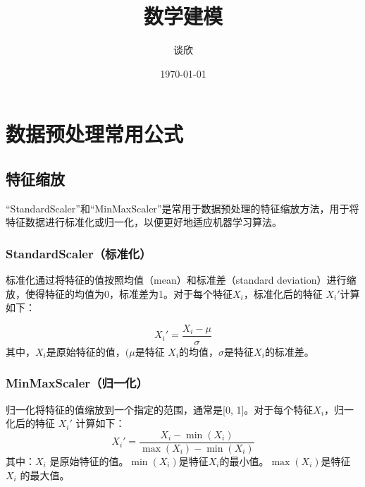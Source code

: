 \documentclass[UTF8,12pt]{ctexart}
\begin{document}
	
	
	
	\title{数学建模}
	\author{谈欣}
	\date{\today}
	\maketitle\newpage
	
	\pagestyle{fancy}
	\tableofcontents\thispagestyle{empty}\newpage
	
	\section{数据预处理常用公式}
	
	
	\subsection{特征缩放}
	
	“StandardScaler”和“MinMaxScaler”是常用于数据预处理的特征缩放方法，用于将特征数据进行标准化或归一化，以便更好地适应机器学习算法。

	\subsubsection{StandardScaler（标准化）}
	
	标准化通过将特征的值按照均值（mean）和标准差（standard deviation）进行缩放，使得特征的均值为0，标准差为1。对于每个特征$X_i$，标准化后的特征 $X_i'$计算如下：
	
		\begin{equation}
			X_i' = \frac{X_i - \mu}{\sigma} 
		\end{equation} 
		其中，$X_i$是原始特征的值，$(\mu$是特征 $X_i$的均值，$\sigma$是特征$X_i$的标准差。

	\subsubsection{MinMaxScaler（归一化）}

	归一化将特征的值缩放到一个指定的范围，通常是[0, 1]。对于每个特征$X_i$，归一化后的特征 $X_i'$ 计算如下：
		\begin{equation}
			X_i' = \frac{X_i - \min(X_i)}{\max(X_i) - \min(X_i)} 
		\end{equation} 
	其中：$X_i$ 是原始特征的值。$\min(X_i)$是特征$X_i$的最小值。$\max(X_i)$是特征 $X_i$ 的最大值。
\end{document}
